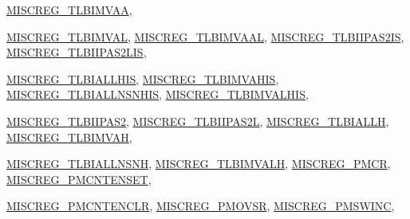 \begin{DoxyCompactItemize}
\hyperlink{namespaceArmISA_a1e522017e015d4c7efd6b2360143aa67a258b6b720804fc11dc719dddfc76ebd0}{MISCREG\_\-TLBIMVAA}, 
\par
\hyperlink{namespaceArmISA_a1e522017e015d4c7efd6b2360143aa67a9b3e09a714ddedc0bfbf2041f501a4fe}{MISCREG\_\-TLBIMVAL}, 
\hyperlink{namespaceArmISA_a1e522017e015d4c7efd6b2360143aa67ae13a787cfaa35339791b1dc24acbb3c0}{MISCREG\_\-TLBIMVAAL}, 
\hyperlink{namespaceArmISA_a1e522017e015d4c7efd6b2360143aa67a0bd1ba3680818bdbecd47a9c8804dcdd}{MISCREG\_\-TLBIIPAS2IS}, 
\hyperlink{namespaceArmISA_a1e522017e015d4c7efd6b2360143aa67abd52b68239af4eafa7931cab5fcc6181}{MISCREG\_\-TLBIIPAS2LIS}, 
\par
\hyperlink{namespaceArmISA_a1e522017e015d4c7efd6b2360143aa67a947a3ec2ca9b753106df42548ba2be34}{MISCREG\_\-TLBIALLHIS}, 
\hyperlink{namespaceArmISA_a1e522017e015d4c7efd6b2360143aa67a586f28dce8e392c8fd2d218cac40d7d0}{MISCREG\_\-TLBIMVAHIS}, 
\hyperlink{namespaceArmISA_a1e522017e015d4c7efd6b2360143aa67a2fde86794d7e789cba1ddd5fde8f3668}{MISCREG\_\-TLBIALLNSNHIS}, 
\hyperlink{namespaceArmISA_a1e522017e015d4c7efd6b2360143aa67a41cb71e8172e83ead8100cea14be66c3}{MISCREG\_\-TLBIMVALHIS}, 
\par
\hyperlink{namespaceArmISA_a1e522017e015d4c7efd6b2360143aa67a905dd21fe4c78d0364f1059dd8fead52}{MISCREG\_\-TLBIIPAS2}, 
\hyperlink{namespaceArmISA_a1e522017e015d4c7efd6b2360143aa67a3b392ce55a2b61f4828f0d1ced560ac0}{MISCREG\_\-TLBIIPAS2L}, 
\hyperlink{namespaceArmISA_a1e522017e015d4c7efd6b2360143aa67ad695ebd033c05b6a771ea9aef158bde5}{MISCREG\_\-TLBIALLH}, 
\hyperlink{namespaceArmISA_a1e522017e015d4c7efd6b2360143aa67a4f3f137c395afada577a0c7693c94e4a}{MISCREG\_\-TLBIMVAH}, 
\par
\hyperlink{namespaceArmISA_a1e522017e015d4c7efd6b2360143aa67a8b3c80e0be52e6629cdebc6e01a8e335}{MISCREG\_\-TLBIALLNSNH}, 
\hyperlink{namespaceArmISA_a1e522017e015d4c7efd6b2360143aa67a0e10dd5bd14a4625a87d1f5ab9abf9ed}{MISCREG\_\-TLBIMVALH}, 
\hyperlink{namespaceArmISA_a1e522017e015d4c7efd6b2360143aa67ad1657398b694d8c27c20bc0a63558451}{MISCREG\_\-PMCR}, 
\hyperlink{namespaceArmISA_a1e522017e015d4c7efd6b2360143aa67a2f4f6195e4277252b7c3fc862c12c6a9}{MISCREG\_\-PMCNTENSET}, 
\par
\hyperlink{namespaceArmISA_a1e522017e015d4c7efd6b2360143aa67ae9591003a8fe135ef5c9b34fbfc6d686}{MISCREG\_\-PMCNTENCLR}, 
\hyperlink{namespaceArmISA_a1e522017e015d4c7efd6b2360143aa67a123de887a65f6cac0030e83dda74ce9c}{MISCREG\_\-PMOVSR}, 
\hyperlink{namespaceArmISA_a1e522017e015d4c7efd6b2360143aa67a64a193876443b3553aee84f552d9f486}{MISCREG\_\-PMSWINC}, 

\end{DoxyCompactItemize}

